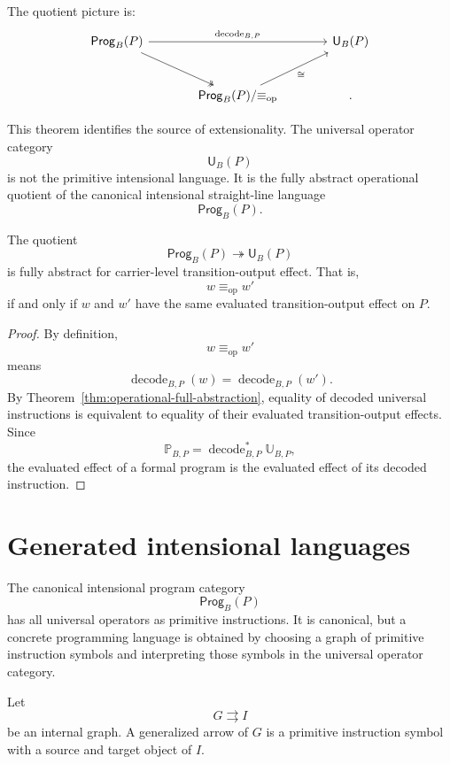 The quotient picture is:
\[
\begin{tikzcd}[column sep=large,row sep=large]
\mathsf{Prog}_B(P)
\ar[rr,"\operatorname{decode}_{B,P}"]
\ar[dr,swap,two heads]
&
&
\mathsf U_B(P)
\\
&
\mathsf{Prog}_B(P)/{\equiv_{\operatorname{op}}}
\ar[ur,swap,"\cong"]
&
.
\end{tikzcd}
\]

This theorem identifies the source of extensionality.  The universal operator category
\[
        \mathsf U_B(P)
\]
is not the primitive intensional language.  It is the fully abstract operational quotient of the
canonical intensional straight-line language
\[
        \mathsf{Prog}_B(P).
\]

\begin{corollary}
\label{cor:full-abstraction-quotient}
The quotient
\[
        \mathsf{Prog}_B(P)\twoheadrightarrow\mathsf U_B(P)
\]
is fully abstract for carrier-level transition-output effect.  That is,
\[
        w\equiv_{\operatorname{op}}w'
\]
if and only if \(w\) and \(w'\) have the same evaluated transition-output effect on \(P\).
\end{corollary}

\begin{proof}
By definition,
\[
        w\equiv_{\operatorname{op}}w'
\]
means
\[
        \operatorname{decode}_{B,P}(w)
        =
        \operatorname{decode}_{B,P}(w').
\]
By Theorem~\ref{thm:operational-full-abstraction}, equality of decoded universal instructions is
equivalent to equality of their evaluated transition-output effects.  Since
\[
        \mathbb P_{B,P}
        =
        \operatorname{decode}_{B,P}^{\ast}\mathbb U_{B,P},
\]
the evaluated effect of a formal program is the evaluated effect of its decoded instruction.
\end{proof}

\section{Generated intensional languages}
\label{sec:generated-intensional-languages}

The canonical intensional program category
\[
        \mathsf{Prog}_B(P)
\]
has all universal operators as primitive instructions.  It is canonical, but a concrete programming
language is obtained by choosing a graph of primitive instruction symbols and interpreting those
symbols in the universal operator category.

Let
\[
        G\rightrightarrows I
\]
be an internal graph.  A generalized arrow of \(G\) is a primitive instruction symbol with a source
and target object of \(I\).

